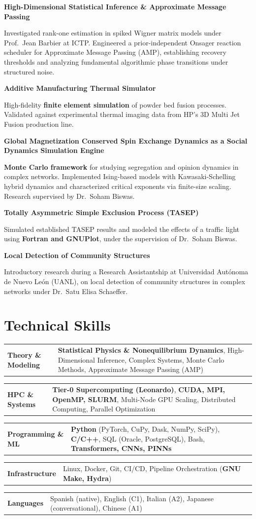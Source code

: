 \documentclass[10pt,a4paper]{article}
\makeatletter
\newcommand{\cvproject}[2]{%
  \vspace{2pt}%
  {\bfseries\color{ink}#1}\par
  \smallskip
  {\color{muted}#2}\par
}
\newcommand{\skillrow}[2]{%
  \begin{tabularx}{\textwidth}{@{}>{\bfseries\color{accent}}m{1.5in}>{\raggedright\arraybackslash}m{\dimexpr\textwidth-1.5in\relax}@{}}
    #1 & #2
  \end{tabularx}\par\vspace{3pt}%
}
\makeatother
\begin{document}
\cvproject{High-Dimensional Statistical Inference \& Approximate Message
Passing}{
  Investigated rank-one estimation in spiked Wigner matrix models under
  Prof.\ Jean Barbier at ICTP. Engineered a prior-independent Onsager reaction
  scheduler for Approximate Message Passing (AMP), establishing recovery
  thresholds and analyzing fundamental algorithmic phase transitions under
  structured noise.
}

\cvproject{Additive Manufacturing Thermal Simulator}{
  High-fidelity \textbf{finite element simulation} of powder bed fusion
  processes. Validated against experimental thermal imaging data from HP's 3D
  Multi Jet Fusion production line.
}

\cvproject{Global Magnetization Conserved Spin Exchange Dynamics as a Social
Dynamics Simulation Engine}{
  \textbf{Monte Carlo framework} for studying segregation and opinion dynamics
  in complex networks. Implemented Ising-based models with Kawasaki-Schelling
  hybrid dynamics and characterized critical exponents via finite-size scaling.
  Research supervised by Dr.\ Soham Biswas.
}

\cvproject{Totally Asymmetric Simple Exclusion Process (TASEP)}{
  Simulated established TASEP results and modeled the effects of a traffic
  light using \textbf{Fortran and GNUPlot}, under the supervision of
  Dr.\ Soham Biswas.
}

\cvproject{Local Detection of Community Structures}{
  Introductory research during a Research Assistantship at Universidad
  Autónoma de Nuevo León (UANL), on local detection of community structures
  in complex networks under Dr.\ Satu Elisa Schaeffer.
}

\section*{Technical Skills}
\skillrow{Theory \& Modeling}{%
  \textbf{Statistical Physics \& Nonequilibrium Dynamics}, High-Dimensional
  Inference, Complex Systems, Monte Carlo Methods, Approximate Message Passing
  (AMP)%
}
\skillrow{HPC \& Systems}{%
  \textbf{Tier-0 Supercomputing (Leonardo)}, \textbf{CUDA, MPI, OpenMP, SLURM},
  Multi-Node GPU Scaling, Distributed Computing, Parallel Optimization%
}
\skillrow{Programming \& ML}{%
  \textbf{Python} (PyTorch, CuPy, Dask, NumPy, SciPy), \textbf{C/C++}, SQL
  (Oracle, PostgreSQL), Bash, \textbf{Transformers, CNNs, PINNs}%
}
\skillrow{Infrastructure}{%
  Linux, Docker, Git, CI/CD, Pipeline Orchestration (\textbf{GNU Make, Hydra})%
}
\skillrow{Languages}{%
  Spanish (native), English (C1), Italian (A2), Japanese
  (conversational), Chinese (A1)%
}
\end{document}
